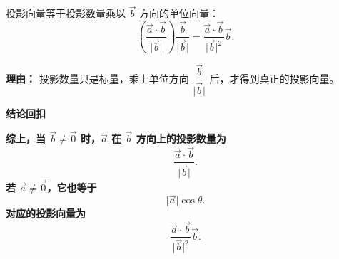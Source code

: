 \begin{proofbox}
\begin{description}[style=nextline, leftmargin=2.8em, labelsep=0.5em, itemsep=0.55em]
		\item[\textbf{步骤六（得到投影向量）：}] 投影向量等于投影数量乘以 $\vec b$ 方向的单位向量：
		      \[
			      \left(\frac{\vec a\cdot\vec b}{\lvert\vec b\rvert}\right)\frac{\vec b}{\lvert\vec b\rvert}
			      =
			      \frac{\vec a\cdot\vec b}{\lvert\vec b\rvert^2}\vec b.
		      \]
		      \par\textbf{理由：}
		      投影数量只是标量，乘上单位方向 $\dfrac{\vec b}{\lvert\vec b\rvert}$ 后，才得到真正的投影向量。
	\end{description}

	\medskip
	\textbf{\textcolor{CProof}{结论回扣}}

	\textbf{综上，当 $\vec b\neq\vec 0$ 时，$\vec a$ 在 $\vec b$ 方向上的投影数量为}
	\[
		\frac{\vec a\cdot\vec b}{\lvert\vec b\rvert}.
	\]
	\textbf{若 $\vec a\neq\vec 0$，它也等于}
	\[
		\lvert\vec a\rvert\cos\theta .
	\]
	\textbf{对应的投影向量为}
	\[
		\frac{\vec a\cdot\vec b}{\lvert\vec b\rvert^2}\vec b.
	\]

\end{proofbox}
